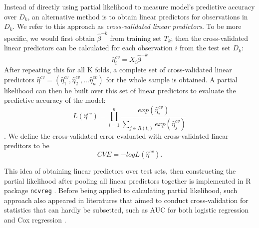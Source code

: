 \par Instead of directly using partial likelihood to measure model's predictive accuracy over $D_k$, an alternative method is to obtain linear predictors for observations in $D_k$. We refer to this approach as \emph{cross-validated linear predictors}. To be more specific, we would first obtain $\hat{\beta}^{-k}$ from training set $T_{k}$; then the cross-validated linear predictors can be calculated for each observation $i$ from the test set $D_k$:  
	\begin{equation}
		\hat{\eta}^{cv}_{i} = X_{i}\hat{\beta}^{-k} 
	\end{equation} 
After repeating this for all K folds, a complete set of cross-validated linear predictors $\hat{\eta}^{cv} = ( \hat{\eta}^{cv}_{1},  \hat{\eta}^{cv}_{2} , ...  \hat{\eta}^{cv}_{n})$ for the whole sample is obtained. A partial likelihood can then be built over this set of linear predictors to evaluate the predictive accuracy of the model: 
	\begin{equation} 
	L(\hat{\eta}^{cv}) = \prod_{i=1}^{n} \frac{exp (\hat{\eta}^{cv}_{i})}{\sum_{ j \in R(t_{i})}exp (\hat{\eta}^{cv}_{j})}
	\end{equation}.
We define the cross-validated error evaluated with cross-validated linear preditors to be $$ CVE = - log L(\hat{\eta}^{cv}).$$ 
\par This idea of obtaining linear predictors over test sets, then constructing the partial likelihood after pooling all linear predictors together is implemented in R package \texttt{ncvreg} \citep{ncvreg}. Before being applied to calculating partial likelihood, such approach also appeared in literatures that aimed to conduct cross-validation for statistics that can hardly be subsetted, such as AUC for both logistic regression and Cox regression \citep{Parker2007}\citep{Simon2011a}\citep{Subramanian2011}.

    
